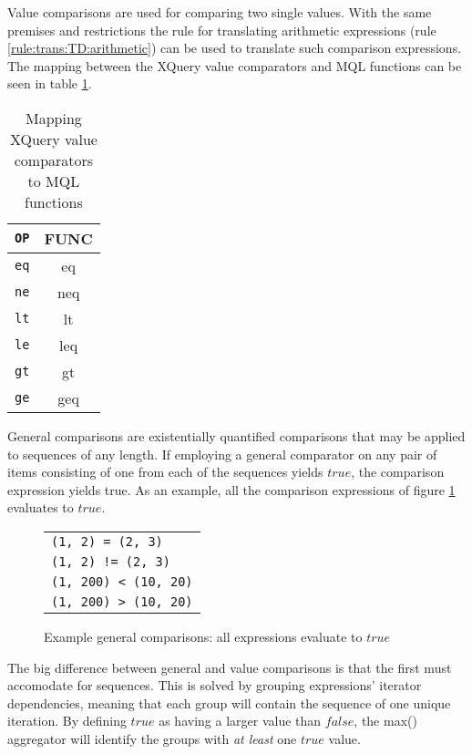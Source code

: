 Value comparisons are used for comparing two single values. With the same premises and restrictions the rule for
translating arithmetic expressions (rule \ref{rule:trans:TD:arithmetic}) can be used to translate such comparison
expressions. The mapping between the XQuery value comparators and MQL functions can be seen in table
\ref{tab:trans:TD:valueComp}.

\begin{table}[h]
\centering
\begin{tabular}{c|c}
\texttt{OP} & \textsf{FUNC} \\ \hline
\texttt{eq} & \textsf{eq} \\
\texttt{ne} & \textsf{neq} \\
\texttt{lt} & \textsf{lt} \\
\texttt{le} & \textsf{leq} \\
\texttt{gt} & \textsf{gt} \\
\texttt{ge} & \textsf{geq} \\
\end{tabular}
\label{tab:trans:TD:valueComp}
\caption{Mapping XQuery value comparators to MQL functions}
\end{table}

General comparisons are existentially quantified comparisons that may be applied to sequences of any length. If
employing a general comparator on any pair of items consisting of one from each of the sequences yields $true$,
the comparison expression yields true. As an example, all the comparison expressions of figure
\ref{fig:trans:TD:genCompEx} evaluates to $true$.

\begin{figure}[h]
\centering
\begin{tabular}{l}
\texttt{(1, 2) = (2, 3)} \\
\texttt{(1, 2) != (2, 3)} \\
\texttt{(1, 200) < (10, 20)} \\
\texttt{(1, 200) > (10, 20)} \\
\end{tabular}
\label{fig:trans:TD:genCompEx}
\caption[Example general comparisons]{Example general comparisons: all expressions evaluate to $true$}
\end{figure}

The big difference between general and value comparisons is that the first must accomodate for sequences. This is
solved by grouping expressions' iterator dependencies, meaning that each group will contain the sequence of one
unique iteration. By defining $true$ as having a larger value than $false$, the \textsf{max()} aggregator will
identify the groups with \emph{at least} one $true$ value.

